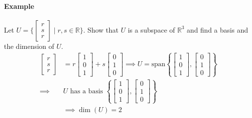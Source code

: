 \paragraph*{Example}
Let $U = \{\begin{bmatrix}
    r \\
    s \\
    r
\end{bmatrix} \mid r, s \in \mathbb{R}\}$. Show that $U$ is a subspace of $\mathbb{R}^3$ and find a basis and the dimension of $U$.
\begin{align*}
    \begin{bmatrix}
        r \\
        s \\
        r
    \end{bmatrix} &= r \begin{bmatrix}
        1 \\
        0 \\
        1
    \end{bmatrix} + s \begin{bmatrix}
        0 \\
        1 \\
        0
    \end{bmatrix} \implies U = \text{span} \left\{ \begin{bmatrix}
        1 \\
        0 \\
        1
    \end{bmatrix}, \begin{bmatrix}
        0 \\
        1 \\
        0
    \end{bmatrix} \right\} \\
    \implies &U \text{ has a basis } \left\{ \begin{bmatrix}
        1 \\
        0 \\
        1
    \end{bmatrix}, \begin{bmatrix}
        0 \\
        1 \\
        0
    \end{bmatrix} \right\} \\
    &\implies \dim(U) = 2  
\end{align*}

